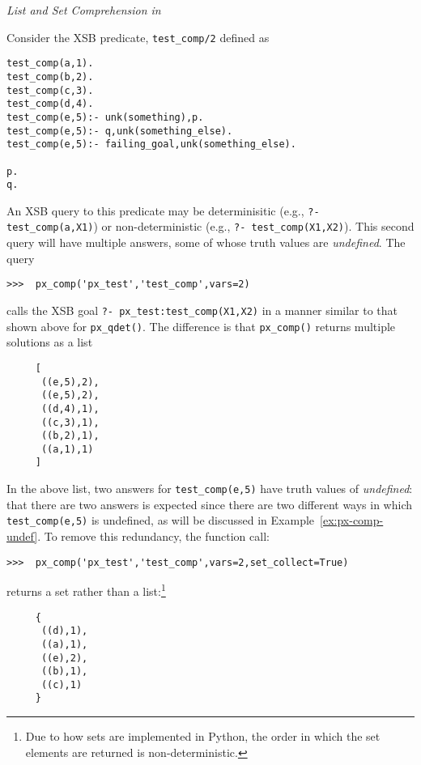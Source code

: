 \begin{example} \rm {\it List and Set Comprehension in \px{}} \label{ex:list-comp-1}

  Consider the XSB predicate, {\tt test\_comp/2} defined as

{\small  
\begin{verbatim}  
test_comp(a,1).
test_comp(b,2).
test_comp(c,3).
test_comp(d,4).
test_comp(e,5):- unk(something),p.
test_comp(e,5):- q,unk(something_else).
test_comp(e,5):- failing_goal,unk(something_else).

p.
q.
\end{verbatim}
}

\noindent
An XSB query to this predicate may be determinisitic (e.g., {\tt ?-
  test\_comp(a,X1)}) or non-deterministic (e.g., {\tt ?-
  test\_comp(X1,X2)}).  This second query will have multiple answers,
some of whose truth values are {\em undefined}.  The \px{} query

\begin{verbatim}
>>>  px_comp('px_test','test_comp',vars=2)
\end{verbatim}

\noindent
calls the XSB goal {\tt ?- px\_test:test\_comp(X1,X2)} in a manner
similar to that shown above for {\tt px\_qdet()}.  The difference is
that {\tt px\_comp()} returns multiple solutions as a list

{\small  
\begin{verbatim}
     [
      ((e,5),2),
      ((e,5),2),
      ((d,4),1),
      ((c,3),1),
      ((b,2),1),
      ((a,1),1) 
     ]
\end{verbatim}
}

\noindent
In the above list, two answers for {\tt test\_comp(e,5)} have truth
values of {\em undefined}: that there are two answers is expected
since there are two different ways in which {\tt test\_comp(e,5)} is
undefined, as will be discussed in Example~\ref{ex:px-comp-undef}.  To
remove this redundancy, the function call:

\begin{verbatim}
>>>  px_comp('px_test','test_comp',vars=2,set_collect=True)
\end{verbatim}

\noindent
returns a set rather than a list:\footnote{Due to how sets are
  implemented in Python, the order in which the set elements are
  returned is non-deterministic.}

{\small  
\begin{verbatim}
     {
      ((d),1),
      ((a),1),
      ((e),2),
      ((b),1),
      ((c),1) 
     }
\end{verbatim}
}


\end{example}
